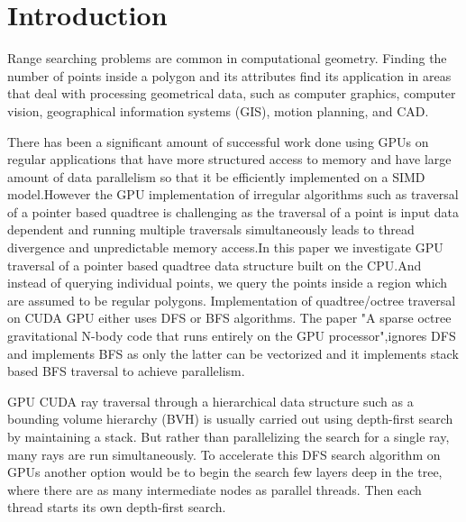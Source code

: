 \documentclass{article}
\begin{document}
\section{Introduction}
Range searching problems are common in computational geometry. Finding the number of points inside a polygon and its attributes find its application in areas that deal with processing geometrical data, such as computer graphics, computer vision, geographical information systems (GIS), motion planning, and CAD. 

There has been a significant amount of successful work done using GPUs on regular applications that have more structured access to memory and have  large amount of data parallelism so that it be efficiently implemented on a SIMD model.However the GPU implementation of irregular algorithms such as traversal of a pointer based quadtree is challenging as the traversal of a point is input data dependent and running multiple traversals simultaneously leads to thread divergence and unpredictable memory access.In this paper we investigate GPU traversal of a pointer based quadtree data structure built on the CPU.And instead of querying individual points, we query the points inside a region which are assumed to be regular polygons.
Implementation of quadtree/octree traversal on CUDA GPU either uses DFS or BFS algorithms. 
The paper "A sparse octree gravitational N-body code that runs entirely on the GPU processor",ignores DFS and implements  BFS as only the latter can be vectorized and it implements stack based BFS traversal to achieve parallelism.

GPU CUDA ray traversal through a hierarchical data structure such as a bounding volume hierarchy (BVH) is usually carried out using depth-first search  by maintaining a stack.
But rather than parallelizing the search for a single ray, many rays are run simultaneously.
To accelerate this DFS search algorithm on GPUs another option would be to begin the search few layers deep in the tree, where there are as many intermediate nodes as parallel threads. Then each thread starts its own depth-first search.
\end{document}
